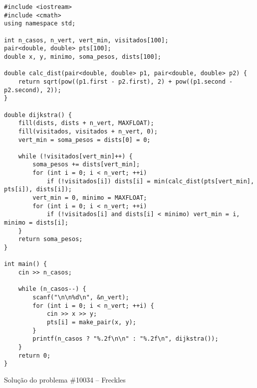\documentclass[a4paper,12pt]{scrartcl}
\begin{document}
\begin{listing}[H]
\begin{verbatim}
#include <iostream>
#include <cmath>
using namespace std;

int n_casos, n_vert, vert_min, visitados[100];
pair<double, double> pts[100];
double x, y, minimo, soma_pesos, dists[100];

double calc_dist(pair<double, double> p1, pair<double, double> p2) {
    return sqrt(pow((p1.first - p2.first), 2) + pow((p1.second - p2.second), 2));
}

double dijkstra() {
    fill(dists, dists + n_vert, MAXFLOAT);
    fill(visitados, visitados + n_vert, 0);
    vert_min = soma_pesos = dists[0] = 0;

    while (!visitados[vert_min]++) {
        soma_pesos += dists[vert_min];
        for (int i = 0; i < n_vert; ++i)
            if (!visitados[i]) dists[i] = min(calc_dist(pts[vert_min], pts[i]), dists[i]);
        vert_min = 0, minimo = MAXFLOAT;
        for (int i = 0; i < n_vert; ++i)
            if (!visitados[i] and dists[i] < minimo) vert_min = i, minimo = dists[i];
    }
    return soma_pesos;
}

int main() {
    cin >> n_casos;

    while (n_casos--) {
        scanf("\n\n%d\n", &n_vert);
        for (int i = 0; i < n_vert; ++i) {
            cin >> x >> y;
            pts[i] = make_pair(x, y);
        }
        printf(n_casos ? "%.2f\n\n" : "%.2f\n", dijkstra());
    }
    return 0;
}
\end{verbatim}
\caption{\footnotesize{Solução do problema \#10034 – Freckles}}
\end{listing}
\end{document}
